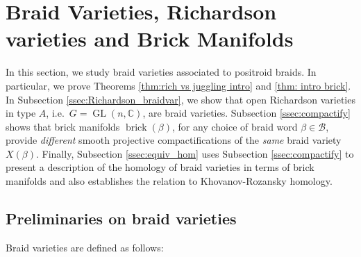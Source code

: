 \documentclass[10pt]{amsart}
\theoremstyle{plain}
\theoremstyle{definition}
\theoremstyle{remark}
\numberwithin{equation}{section}
\newcommand{\C}{\mathbb{C}}
\newcommand{\GL}{\operatorname{GL}}
\renewcommand{\C}{\mathbb{C}}
\newcommand{\cB}{\mathcal{B}}
\newcommand{\brick}{\operatorname{brick}}
\begin{document}
\section{Braid Varieties, Richardson varieties and Brick Manifolds}\label{sec:brick} In this section, we study braid varieties associated to positroid braids. In particular, we prove Theorems \ref{thm:rich vs juggling intro} and \ref{thm: intro brick}. In Subsection \ref{ssec:Richardson_braidvar}, we show that open Richardson varieties in type $A$, i.e.~$G=\GL(n,\C)$, are braid varieties. Subsection \ref{ssec:compactify} shows that brick manifolds $\brick(\beta)$, for any choice of braid word $\beta\in\cB$, provide {\it different} smooth projective compactifications of the {\it same} braid variety $X(\beta)$. Finally, Subsection \ref{ssec:equiv_hom} uses Subsection \ref{ssec:compactify} to present a description of the homology of braid varieties in terms of brick manifolds and also establishes the relation to Khovanov-Rozansky homology.



\subsection{Preliminaries on braid varieties}\label{ssec:braid_prelim} Braid varieties are defined as follows:
\end{document}
